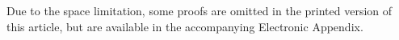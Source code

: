 \documentclass[UKenglish,acmsmall,authorversion]{acmart}
\newcommand{\tohide}[2]{#1} %
\theoremstyle{plain}
\begin{document}
Due to the space limitation, some proofs are omitted in the printed version of this article, but are available in the accompanying Electronic Appendix.

\end{document}
